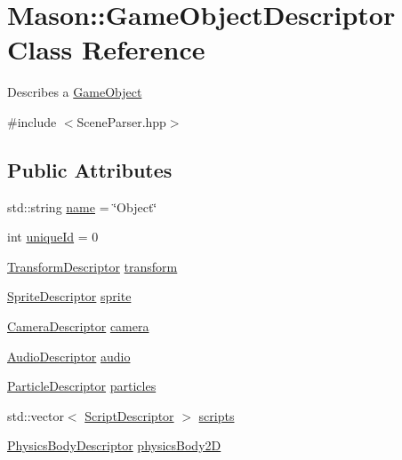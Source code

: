\hypertarget{class_mason_1_1_game_object_descriptor}{}\section{Mason\+:\+:Game\+Object\+Descriptor Class Reference}
\label{class_mason_1_1_game_object_descriptor}


Describes a \hyperlink{class_mason_1_1_game_object}{Game\+Object} ~\newline
  




{\ttfamily \#include $<$Scene\+Parser.\+hpp$>$}

\subsection*{Public Attributes}
\begin{DoxyCompactItemize}
\item 
std\+::string \hyperlink{class_mason_1_1_game_object_descriptor_aea3fddf12ef08c91e1f5e422c7521e18}{name} = \char`\"{}Object\char`\"{}
\item 
int \hyperlink{class_mason_1_1_game_object_descriptor_aafbd17cd506939c46ce70b550762e2d1}{unique\+Id} = 0
\item 
\hyperlink{class_mason_1_1_transform_descriptor}{Transform\+Descriptor} \hyperlink{class_mason_1_1_game_object_descriptor_aa22b35eef207a8451a3ad6b816ecd5ac}{transform}
\item 
\hyperlink{class_mason_1_1_sprite_descriptor}{Sprite\+Descriptor} \hyperlink{class_mason_1_1_game_object_descriptor_aa7e89568fa330d9337093a73b63f2d3e}{sprite}
\item 
\hyperlink{class_mason_1_1_camera_descriptor}{Camera\+Descriptor} \hyperlink{class_mason_1_1_game_object_descriptor_a9b2710a89f6a1bb223594a2762340414}{camera}
\item 
\hyperlink{class_mason_1_1_audio_descriptor}{Audio\+Descriptor} \hyperlink{class_mason_1_1_game_object_descriptor_a121843bc6264f0828e8672b1b390b21b}{audio}
\item 
\hyperlink{class_mason_1_1_particle_descriptor}{Particle\+Descriptor} \hyperlink{class_mason_1_1_game_object_descriptor_aa51c7f6f6a4cb0720c352cd504d4593c}{particles}
\item 
std\+::vector$<$ \hyperlink{class_mason_1_1_script_descriptor}{Script\+Descriptor} $>$ \hyperlink{class_mason_1_1_game_object_descriptor_a07c8b975f3306740060a73924c6315a7}{scripts}
\item 
\hyperlink{class_mason_1_1_physics_body_descriptor}{Physics\+Body\+Descriptor} \hyperlink{class_mason_1_1_game_object_descriptor_a923994ccf28b36e3349e6355d3d0d6bd}{physics\+Body2D}
\end{DoxyCompactItemize}



